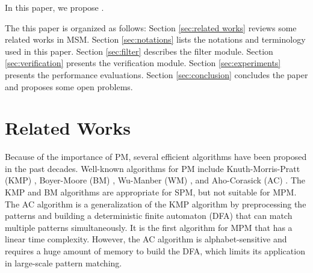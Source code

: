 In this paper, we propose .


The this paper is organized as follows: Section \ref{sec:related
  works} reviews some related works in MSM. Section
\ref{sec:notations} lists the notations and terminology used in this
paper. Section \ref{sec:filter} describes the filter module. Section
\ref{sec:verification} presents the verification module. Section
\ref{sec:experiments} presents the performance evaluations. Section
\ref{sec:conclusion} concludes the paper and proposes some open
problems.

\section{Related Works}
\label{sec:related works}

Because of the importance of PM, several efficient algorithms have
been proposed in the past decades. Well-known algorithms for PM
include Knuth-Morris-Pratt (\textsf{KMP}) \cite{Knuth1977},
Boyer-Moore (\textsf{BM}) \cite{Boyer1977}, Wu-Manber (\textsf{WM})
\cite{Wu1994}, and Aho-Corasick (\textsf{AC}) \cite{Aho1975}. The
\textsf{KMP} and \textsf{BM} algorithms are appropriate for SPM, but
not suitable for MPM. The \textsf{AC} algorithm is a generalization of
the \textsf{KMP} algorithm by preprocessing the patterns and building
a deterministic finite automaton (DFA) that can match multiple
patterns simultaneously. It is the first algorithm for MPM that has a
linear time complexity. However, the \textsf{AC} algorithm is
alphabet-sensitive and requires a huge amount of memory to build the
DFA, which limits its application in large-scale pattern matching.

